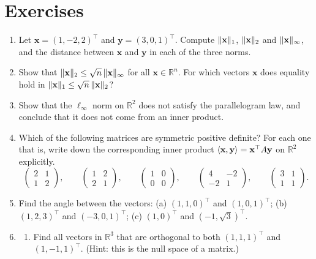 \section{Exercises}\label{L2-sec:exercises}
\begin{enumerate}[leftmargin=*]
    \item Let $\mathbf{x} = (1, -2, 2)^\top$ and $\mathbf{y} = (3, 0, 1)^\top$. Compute $\lVert \mathbf{x} \rVert_1$, $\lVert \mathbf{x} \rVert_2$ and $\lVert \mathbf{x} \rVert_\infty$, and the distance between $\mathbf{x}$ and $\mathbf{y}$ in each of the three norms.
    \item Show that $\lVert \mathbf{x} \rVert_2 \leq \sqrt{n}\, \lVert \mathbf{x} \rVert_\infty$ for all $\mathbf{x} \in \mathbb{R}^n$. For which vectors $\mathbf{x}$ does equality hold in $\lVert \mathbf{x} \rVert_1 \leq \sqrt{n}\, \lVert \mathbf{x} \rVert_2$?
    \item Show that the $\ell_\infty$ norm on $\mathbb{R}^2$ does not satisfy the parallelogram law, and conclude that it does not come from an inner product.
    \item Which of the following matrices are symmetric positive definite? For each one that is, write down the corresponding inner product $\langle \mathbf{x}, \mathbf{y} \rangle = \mathbf{x}^\top A \mathbf{y}$ on $\mathbb{R}^2$ explicitly.
    \[\begin{pmatrix} 2 & 1 \\ 1 & 2 \end{pmatrix}, \qquad \begin{pmatrix} 1 & 2 \\ 2 & 1 \end{pmatrix}, \qquad \begin{pmatrix} 1 & 0 \\ 0 & 0 \end{pmatrix}, \qquad \begin{pmatrix} 4 & -2 \\ -2 & 1 \end{pmatrix}, \qquad \begin{pmatrix} 3 & 1 \\ 1 & 1 \end{pmatrix}.\]
    \item Find the angle between the vectors: (a) $(1, 1, 0)^\top$ and $(1, 0, 1)^\top$; (b) $(1, 2, 3)^\top$ and $(-3, 0, 1)^\top$; (c) $(1, 0)^\top$ and $(-1, \sqrt{3})^\top$.
    \item \begin{enumerate}[label=(\alph*)]
        \item Find all vectors in $\mathbb{R}^3$ that are orthogonal to both $(1, 1, 1)^\top$ and $(1, -1, 1)^\top$. (Hint: this is the null space of a matrix.)

\end{enumerate}
\end{enumerate}
